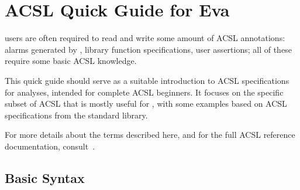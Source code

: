 \documentclass{frama-c-book}
\begin{document}




\appendix
\chapter{ACSL Quick Guide for Eva}
\label{sec:acsl-quick-guide}

\Eva{} users are often required to read and write some amount of ACSL
annotations: alarms generated by \Eva{}, library function specifications,
user assertions; all of these require some basic ACSL knowledge.

This quick guide should serve as a suitable introduction to ACSL specifications
for \Eva{} analyses, intended for complete ACSL beginners.
It focuses on the specific subset of ACSL that is mostly useful for \Eva{}, with
some examples based on ACSL specifications from the \FramaC standard library.

For more details about the terms described here, and for the full
ACSL reference documentation, consult~\cite{acsl}.

\section{Basic Syntax}
\end{document}
